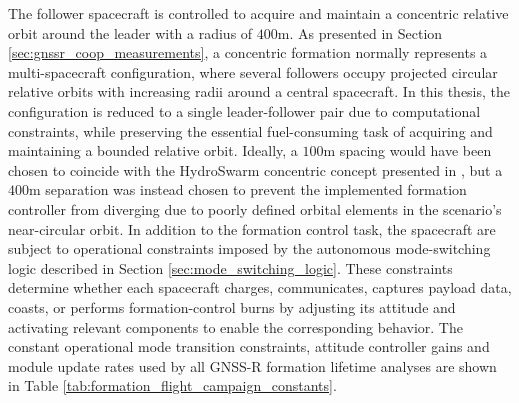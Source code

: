 The follower spacecraft is controlled to acquire and maintain a concentric relative orbit around the leader with a radius of $400\mathrm{m}$. As presented in Section \ref{sec:gnssr_coop_measurements}, a concentric formation normally represents a multi-spacecraft configuration, where several followers occupy projected circular relative orbits with increasing radii around a central spacecraft. In this thesis, the configuration is reduced to a single leader-follower pair due to computational constraints, while preserving the essential fuel-consuming task of acquiring and maintaining a bounded relative orbit. Ideally, a $100\mathrm{m}$ spacing would have been chosen to coincide with the HydroSwarm concentric concept presented in \cite{hill2025hydroswarm}, but a $400\mathrm{m}$ separation was instead chosen to prevent the implemented formation controller from diverging due to poorly defined orbital elements in the scenario's near-circular orbit. In addition to the formation control task, the spacecraft are subject to operational constraints imposed by the autonomous mode-switching logic described in Section \ref{sec:mode_switching_logic}. These constraints determine whether each spacecraft charges, communicates, captures payload data, coasts, or performs formation-control burns by adjusting its attitude and activating relevant components to enable the corresponding behavior. The constant operational mode transition constraints, attitude controller gains and module update rates used by all GNSS-R formation lifetime analyses are shown in Table \ref{tab:formation_flight_campaign_constants}.

